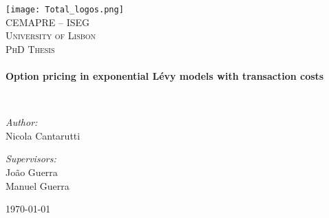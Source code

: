 \begin{titlepage}
\begin{center}


\texttt{[image: Total\_logos.png]}~\\[1cm]

\textsc{\Large CEMAPRE -- ISEG}\\[0.5cm]
\textsc{\Large University of Lisbon}\\[2cm]

\textsc{\LARGE PhD Thesis}\\[0.5cm]

\HRule \\[0.4cm]
{ \huge \bfseries Option pricing in exponential Lévy models with transaction costs \\[0.4cm] }

\HRule \\[1.5cm]

\noindent
\begin{minipage}{0.5\textwidth}
\begin{flushleft} \large
\emph{Author:}\\
Nicola Cantarutti
\end{flushleft}
\end{minipage}%
\begin{minipage}{0.5\textwidth}
\begin{flushright} \large
\emph{Supervisors:} \\
João Guerra\\
Manuel Guerra\\
\end{flushright}
\end{minipage}

\vfill

{\large \today}\\[0.3cm]

\end{center}
\end{titlepage}